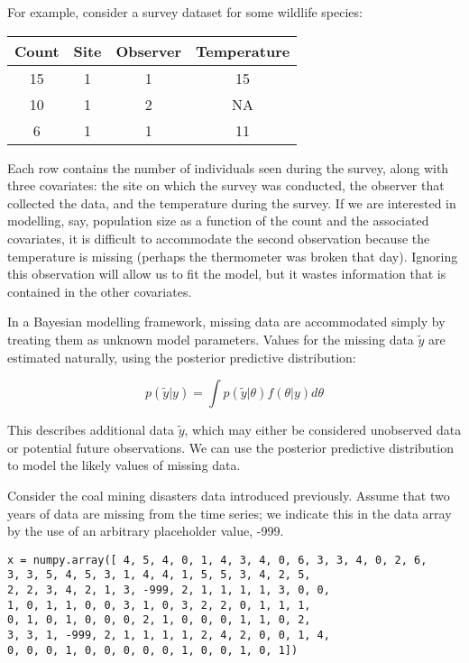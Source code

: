 For example, consider a survey dataset for some wildlife species:

\begin{center}
\begin{tabular}{cccc}
\hline
Count & Site & Observer & Temperature\\
\hline
15 & 1 & 1 & 15\\
10 & 1 & 2 & NA\\
6 & 1 & 1 & 11\\
\hline
\end{tabular}
\end{center}

Each row contains the number of individuals seen during the survey, along with three covariates: the site on which the survey was conducted, the observer that collected the data, and the temperature during the survey. If we are interested in modelling, say, population size as a function of the count and the associated covariates, it is difficult to accommodate the second observation because the temperature is missing (perhaps the thermometer was broken that day). Ignoring this observation will allow us to fit the model, but it wastes information that is contained in the other covariates. 

In a Bayesian modelling framework, missing data are accommodated simply by treating them as unknown model parameters. Values for the missing data $\tilde{y}$ are estimated naturally, using the posterior predictive distribution:

\begin{equation}
	p(\tilde{y}|y) = \int p(\tilde{y}|\theta) f(\theta|y) d\theta
\end{equation}

This describes additional data $\tilde{y}$, which may either be considered unobserved data or potential future observations. We can use the posterior predictive distribution to model the likely values of missing data.

Consider the coal mining disasters data introduced previously. Assume that two years of data are missing from the time series; we indicate this in the data array by the use of an arbitrary placeholder value, -999. 

\begin{verbatim}
x = numpy.array([ 4, 5, 4, 0, 1, 4, 3, 4, 0, 6, 3, 3, 4, 0, 2, 6,
3, 3, 5, 4, 5, 3, 1, 4, 4, 1, 5, 5, 3, 4, 2, 5,
2, 2, 3, 4, 2, 1, 3, -999, 2, 1, 1, 1, 1, 3, 0, 0,
1, 0, 1, 1, 0, 0, 3, 1, 0, 3, 2, 2, 0, 1, 1, 1,
0, 1, 0, 1, 0, 0, 0, 2, 1, 0, 0, 0, 1, 1, 0, 2,
3, 3, 1, -999, 2, 1, 1, 1, 1, 2, 4, 2, 0, 0, 1, 4,
0, 0, 0, 1, 0, 0, 0, 0, 0, 1, 0, 0, 1, 0, 1])
\end{verbatim}

